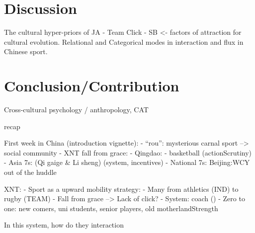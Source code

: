 \section{Discussion}

The cultural hyper-priors of JA - Team Click - SB <- factors of attraction for cultural evolution.
Relational and Categorical modes in interaction and flux in Chinese sport.

\section{Conclusion/Contribution}
Cross-cultural psychology / anthropology, CAT

recap
































First week in China (introduction vignette):
- ``rou'': mysterious carnal sport --> social community
- XNT fall from grace:
- Qingdao:
    - basketball (actionScrutiny)
    - Asia 7s: (Qi gaige & Li sheng) (system, incentives)
    - National 7s: Beijing:WCY out of the huddle


XNT:
- Sport as a upward mobility strategy:
    - Many from athletics (IND) to rugby (TEAM)
- Fall from grace --> Lack of click?
- System: coach ()
- Zero to one: new comers, uni students, senior players, old motherlandStrength

In this system, how do they interaction
